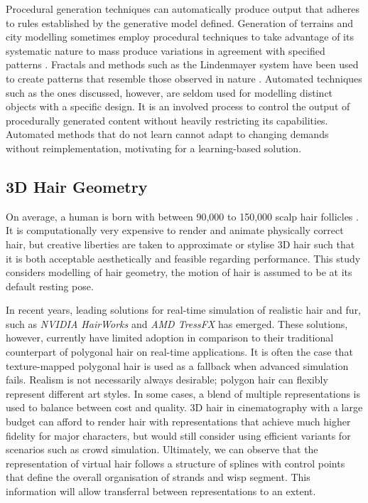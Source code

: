 \documentclass[ %
author={Dillon Keith Diep},
supervisor={Dr. Carl Henrik Ek},
degree={MEng},
title={ART-CG Hair:},
subtitle={Assisted Real-time Content Generation of Stylised Virtual Hair},
type={Research},
year={2017} ]{dissertation}
\begin{document}
	Procedural generation techniques can automatically produce output that adheres to rules established by the generative model defined. Generation of terrains and city modelling sometimes employ procedural techniques to take advantage of its systematic nature to mass produce variations in agreement with specified patterns \cite{procedural1}. Fractals and methods such as the Lindenmayer system have been used to create patterns that resemble those observed in nature \cite{lsystem}. Automated techniques such as the ones discussed, however, are seldom used for modelling distinct objects with a specific design. It is an involved process to control the output of procedurally generated content without heavily restricting its capabilities. Automated methods that do not learn cannot adapt to changing demands without reimplementation, motivating for a learning-based solution.
	
	\subsection{3D Hair Geometry}
	On average, a human is born with between 90,000 to 150,000 scalp hair follicles \cite{hairfollicles}. It is computationally very expensive to render and animate physically correct hair, but creative liberties are taken to approximate or stylise 3D hair such that it is both acceptable aesthetically and feasible regarding performance. This study considers modelling of hair geometry, the motion of hair is assumed to be at its default resting pose.
	
	In recent years, leading solutions for real-time simulation of realistic hair and fur, such as \textit{NVIDIA HairWorks} and \textit{AMD TressFX} has emerged. These solutions, however, currently have limited adoption in comparison to their traditional counterpart of polygonal hair on real-time applications. It is often the case that texture-mapped polygonal hair is used as a fallback when advanced simulation fails. Realism is not necessarily always desirable; polygon hair can flexibly represent different art styles. In some cases, a blend of multiple representations is used to balance between cost and quality. 3D hair in cinematography with a large budget can afford to render hair with representations that achieve much higher fidelity for major characters, but would still consider using efficient variants for scenarios such as crowd simulation. Ultimately, we can observe that the representation of virtual hair follows a structure of splines with control points that define the overall organisation of strands and wisp segment. This information will allow transferral between representations to an extent.
	
\end{document}
